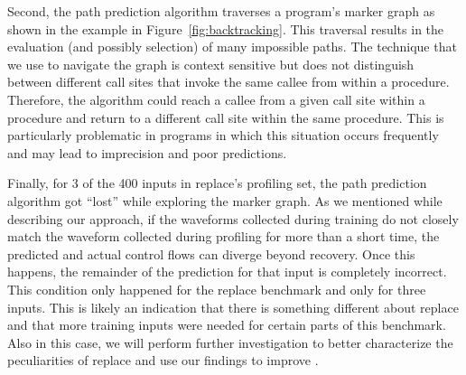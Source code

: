 Second, the path prediction algorithm traverses a program's marker graph as shown in the example in Figure~\ref{fig:backtracking}. This traversal results in the evaluation (and possibly selection) of many impossible paths. The technique that we use to navigate the graph is context sensitive but does not distinguish between different call sites that invoke the same callee from within a procedure. Therefore, the algorithm could reach a callee from a given call site within a procedure and return to a different call site within the same procedure. This is particularly problematic in programs in which this situation occurs frequently and may lead to imprecision and poor predictions.

Finally, for 3 of the 400 inputs in replace's profiling set, the path prediction algorithm got ``lost'' while exploring the marker graph. As we mentioned while describing our approach, if the waveforms collected during training do not closely match the waveform collected during profiling for more than a short time, the predicted and actual control flows can diverge beyond recovery. Once this happens, the remainder of the prediction for that input is completely incorrect. This condition only happened for the replace benchmark and only for three inputs. This is likely an indication that there is something different about replace and that more training inputs were needed for certain parts of this benchmark. Also in this case, we will perform further investigation to better characterize the peculiarities of replace and use our findings to improve \zop.
